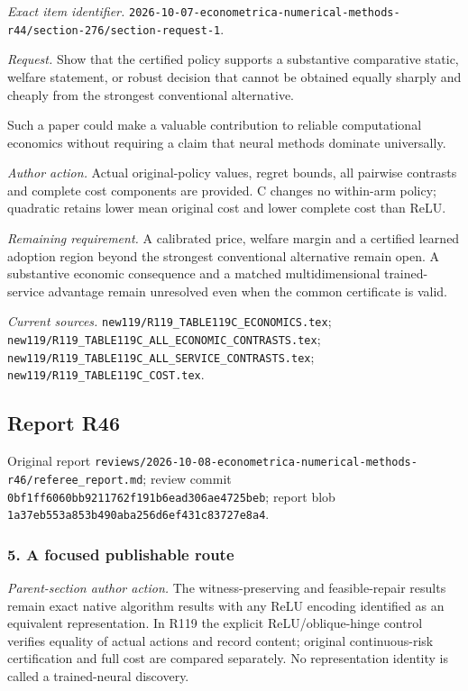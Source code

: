 \emph{Exact item identifier.} \nolinkurl{2026-10-07-econometrica-numerical-methods-r44/section-276/section-request-1}.

\par\emph{Request.} Show that the certified policy supports a substantive comparative static, welfare statement, or robust decision that cannot be obtained equally sharply and cheaply from the strongest conventional alternative.

Such a paper could make a valuable contribution to reliable computational economics without requiring a claim that neural methods dominate universally.

\par\emph{Author action.} Actual original-policy values, regret bounds, all pairwise contrasts and complete cost components are provided. C changes no within-arm policy; quadratic retains lower mean original cost and lower complete cost than ReLU.

\par\emph{Remaining requirement.} A calibrated price, welfare margin and a certified learned adoption region beyond the strongest conventional alternative remain open. A substantive economic consequence and a matched multidimensional trained-service advantage remain unresolved even when the common certificate is valid.

\par\emph{Current sources.} \nolinkurl{new119/R119_TABLE119C_ECONOMICS.tex}; \nolinkurl{new119/R119_TABLE119C_ALL_ECONOMIC_CONTRASTS.tex}; \nolinkurl{new119/R119_TABLE119C_ALL_SERVICE_CONTRASTS.tex}; \nolinkurl{new119/R119_TABLE119C_COST.tex}.

\subsection{Report R46}

Original report \nolinkurl{reviews/2026-10-08-econometrica-numerical-methods-r46/referee_report.md}; review commit \nolinkurl{0bf1ff6060bb9211762f191b6ead306ae4725beb}; report blob \nolinkurl{1a37eb553a853b490aba256d6ef431c83727e8a4}.

\subsubsection{5. A focused publishable route}

\emph{Parent-section author action.} The witness-preserving and feasible-repair results remain exact native algorithm results with any ReLU encoding identified as an equivalent representation. In R119 the explicit ReLU/\allowbreak{}oblique-hinge control verifies equality of actual actions and record content; original continuous-risk certification and full cost are compared separately. No representation identity is called a trained-neural discovery.

